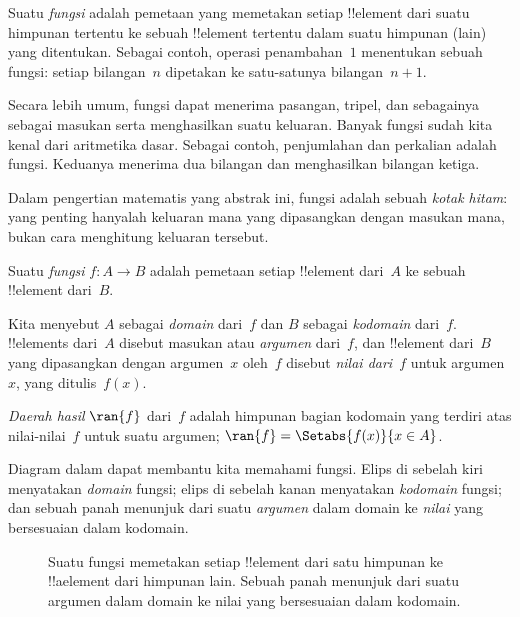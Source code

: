 \documentclass[../../../include/open-logic-section]{subfiles}
\begin{document}

\begin{explain}
Suatu \emph{fungsi} adalah pemetaan yang memetakan setiap !!{element} dari
suatu himpunan tertentu ke sebuah !!{element} tertentu dalam suatu himpunan
(lain) yang ditentukan. Sebagai contoh, operasi penambahan~$1$ menentukan
sebuah fungsi: setiap bilangan~$n$ dipetakan ke satu-satunya bilangan~$n+1$.

Secara lebih umum, fungsi dapat menerima pasangan, tripel, dan sebagainya
sebagai masukan serta menghasilkan suatu keluaran. Banyak fungsi sudah kita
kenal dari aritmetika dasar. Sebagai contoh, penjumlahan dan perkalian adalah
fungsi. Keduanya menerima dua bilangan dan menghasilkan bilangan ketiga.

Dalam pengertian matematis yang abstrak ini, fungsi adalah sebuah \emph{kotak
hitam}: yang penting hanyalah keluaran mana yang dipasangkan dengan masukan
mana, bukan cara menghitung keluaran tersebut.
\end{explain}

\begin{defn}[Fungsi]
Suatu \emph{fungsi} $f \colon A \to B$ adalah pemetaan setiap !!{element}
dari~$A$ ke sebuah !!{element} dari~$B$.

Kita menyebut $A$ sebagai \emph{domain} dari~$f$ dan $B$ sebagai
\emph{kodomain} dari~$f$. !!{element}s dari~$A$ disebut masukan atau
\emph{argumen} dari~$f$, dan !!{element} dari~$B$ yang dipasangkan dengan
argumen~$x$ oleh~$f$ disebut \emph{nilai dari~$f$} untuk argumen~$x$, yang
ditulis~$f(x)$.

\emph{Daerah hasil} $\ran{f}$ dari~$f$ adalah himpunan bagian kodomain yang
terdiri atas nilai-nilai~$f$ untuk suatu argumen; $\ran{f} =
\Setabs{f(x)}{x \in A}$.
\end{defn}

Diagram dalam  dapat membantu kita memahami fungsi. Elips
di sebelah kiri menyatakan \emph{domain} fungsi; elips di sebelah kanan
menyatakan \emph{kodomain} fungsi; dan sebuah panah menunjuk dari suatu
\emph{argumen} dalam domain ke \emph{nilai} yang bersesuaian dalam kodomain.

\begin{figure}
  \caption{Suatu fungsi memetakan setiap !!{element} dari satu himpunan ke
    !!a{element} dari himpunan lain. Sebuah panah menunjuk dari suatu argumen
    dalam domain ke nilai yang bersesuaian dalam kodomain.}
\end{figure}
\end{document}
